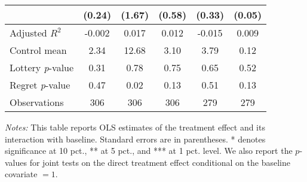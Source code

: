 \begin{table}[htbp]
{\begin{threeparttable}
\begin{tabular}{l*{5}{c}}
                &   (0.24)         &   (1.67)         &   (0.58)         &   (0.33)         &   (0.05)         \\
\midrule
Adjusted \(R^{2}\)&   -0.002         &    0.017         &    0.012         &   -0.015         &    0.009         \\
Control mean    &     2.34         &    12.68         &     3.10         &     3.79         &     0.12         \\
Lottery \emph{p}-value&     0.31         &     0.78         &     0.75         &     0.65         &     0.52         \\
Regret \emph{p}-value&     0.47         &     0.02         &     0.13         &     0.51         &     0.13         \\
Observations    &      306         &      306         &      306         &      279         &      279         \\
\bottomrule \end{tabular} \begin{tablenotes}[flushleft] \footnotesize \item \emph{Notes:} This table reports OLS estimates of the treatment effect and its interaction with baseline. Standard errors are in parentheses. * denotes significance at 10 pct., ** at 5 pct., and *** at 1 pct. level. We also report the \(p\)-values for joint tests on the direct treatment effect conditional on the baseline covariate $= 1$. \end{tablenotes} \end{threeparttable} } \end{table}
